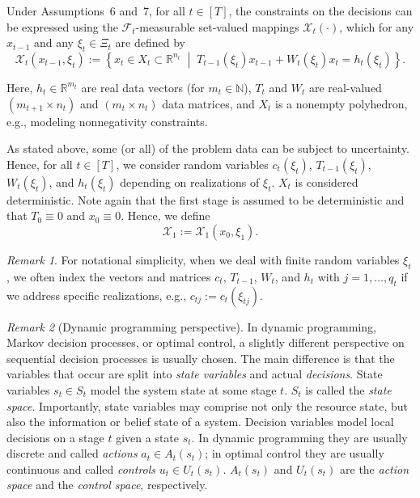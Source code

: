 \documentclass{article}
\theoremstyle{remark}
\newtheorem{remark}{Remark}
\begin{document}
Under Assumptions~6 and~7, for all $t \in [T]$, the constraints on the decisions can be 
expressed using the $\mathcal{F}_t$-measurable set-valued mappings $\mathcal{X}_t(\cdot)$, 
which for any $x_{t-1}$ and any $\xi_t \in \Xi_t$ are defined by
\begin{equation}\label{eq:constraints}
\mathcal{X}_t(x_{t-1},\xi_t)
:=
\left\{
x_t \in X_t \subset \mathbb{R}^{n_t}
\;\middle|\;
T_{t-1}(\xi_t)x_{t-1} + W_t(\xi_t)x_t = h_t(\xi_t)
\right\}.
\end{equation}

Here, $h_t \in \mathbb{R}^{m_t}$ are real data vectors (for $m_t \in \mathbb{N}$), 
$T_t$ and $W_t$ are real-valued $(m_{t+1} \times n_t)$ and $(m_t \times n_t)$ data 
matrices, and $X_t$ is a nonempty polyhedron, e.g., modeling nonnegativity constraints.

As stated above, some (or all) of the problem data can be subject to uncertainty. 
Hence, for all $t \in [T]$, we consider random variables $c_t(\xi_t)$, 
$T_{t-1}(\xi_t)$, $W_t(\xi_t)$, and $h_t(\xi_t)$ depending on realizations of $\xi_t$. 
$X_t$ is considered deterministic. Note again that the first stage is assumed to be 
deterministic and that $T_0 \equiv 0$ and $x_0 \equiv 0$. Hence, we define
\[
\mathcal{X}_1 := \mathcal{X}_1(x_0,\xi_1).
\]

\begin{remark}
For notational simplicity, when we deal with finite random variables $\xi_t$, we often 
index the vectors and matrices $c_t$, $T_{t-1}$, $W_t$, and $h_t$ with $j=1,\ldots,q_t$ 
if we address specific realizations, e.g., $c_{tj} := c_t(\xi_{tj})$.
\end{remark}

\begin{remark}[Dynamic programming perspective]
In dynamic programming, Markov decision processes, or optimal control, a slightly 
different perspective on sequential decision processes is usually chosen. The main difference is that the variables that occur 
are split into \emph{state variables} and actual \emph{decisions}. State variables 
$s_t \in S_t$ model the system state at some stage $t$. $S_t$ is called the 
\emph{state space}. Importantly, state variables may comprise not only the resource 
state, but also the information or belief state of a system. Decision 
variables model local decisions on a stage $t$ given a state $s_t$. In dynamic 
programming they are usually discrete and called \emph{actions} $a_t \in A_t(s_t)$; 
in optimal control they are usually continuous and called \emph{controls} 
$u_t \in U_t(s_t)$. $A_t(s_t)$ and $U_t(s_t)$ are the \emph{action space} and the 
\emph{control space}, respectively.
\end{remark}
\end{document}

